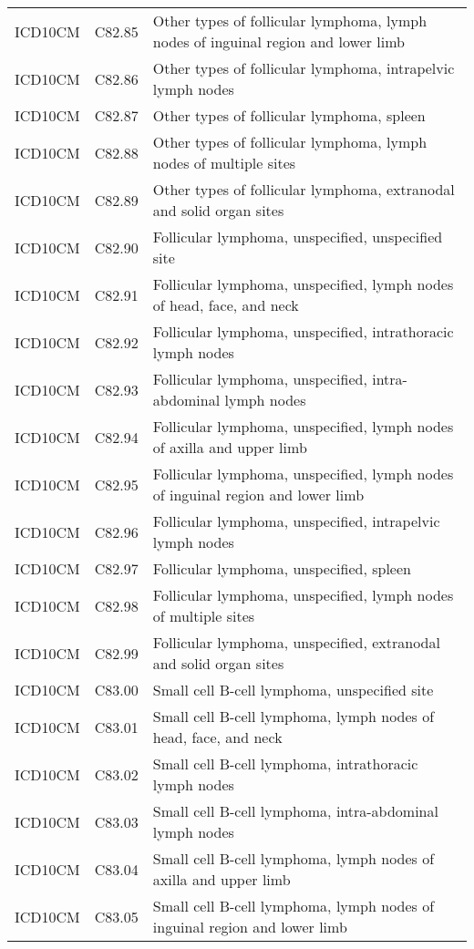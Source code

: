 \begin{longtable}{p{}p{}p{}}
  ICD10CM & C82.85 & Other types of follicular lymphoma, lymph nodes of inguinal region and lower limb \\ 
  ICD10CM & C82.86 & Other types of follicular lymphoma, intrapelvic lymph nodes \\ 
  ICD10CM & C82.87 & Other types of follicular lymphoma, spleen \\ 
  ICD10CM & C82.88 & Other types of follicular lymphoma, lymph nodes of multiple sites \\ 
  ICD10CM & C82.89 & Other types of follicular lymphoma, extranodal and solid organ sites \\ 
  ICD10CM & C82.90 & Follicular lymphoma, unspecified, unspecified site \\ 
  ICD10CM & C82.91 & Follicular lymphoma, unspecified, lymph nodes of head, face, and neck \\ 
  ICD10CM & C82.92 & Follicular lymphoma, unspecified, intrathoracic lymph nodes \\ 
  ICD10CM & C82.93 & Follicular lymphoma, unspecified, intra-abdominal lymph nodes \\ 
  ICD10CM & C82.94 & Follicular lymphoma, unspecified, lymph nodes of axilla and upper limb \\ 
  ICD10CM & C82.95 & Follicular lymphoma, unspecified, lymph nodes of inguinal region and lower limb \\ 
  ICD10CM & C82.96 & Follicular lymphoma, unspecified, intrapelvic lymph nodes \\ 
  ICD10CM & C82.97 & Follicular lymphoma, unspecified, spleen \\ 
  ICD10CM & C82.98 & Follicular lymphoma, unspecified, lymph nodes of multiple sites \\ 
  ICD10CM & C82.99 & Follicular lymphoma, unspecified, extranodal and solid organ sites \\ 
  ICD10CM & C83.00 & Small cell B-cell lymphoma, unspecified site \\ 
  ICD10CM & C83.01 & Small cell B-cell lymphoma, lymph nodes of head, face, and neck \\ 
  ICD10CM & C83.02 & Small cell B-cell lymphoma, intrathoracic lymph nodes \\ 
  ICD10CM & C83.03 & Small cell B-cell lymphoma, intra-abdominal lymph nodes \\ 
  ICD10CM & C83.04 & Small cell B-cell lymphoma, lymph nodes of axilla and upper limb \\ 
  ICD10CM & C83.05 & Small cell B-cell lymphoma, lymph nodes of inguinal region and lower limb \\ 

\end{longtable}
